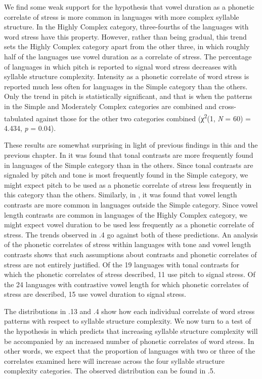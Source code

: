   We find some weak support for the hypothesis that vowel duration as a phonetic correlate of stress is more common in languages with more complex syllable structure. In the Highly Complex category, three-fourths of the languages with word stress have this property. However, rather than being gradual, this trend sets the Highly Complex category apart from the other three, in which roughly half of the languages use vowel duration as a correlate of stress. The percentage of languages in which pitch is reported to signal word stress decreases with syllable structure complexity. Intensity as a phonetic correlate of word stress is reported much less often for languages in the Simple category than the others. Only the trend in pitch is statistically significant, and that is when the patterns in the Simple and Moderately Complex categories are combined and cross-tabulated against those for the other two categories combined (χ\textsuperscript{2}(1, \textit{N} = 60) = 4.434, \textit{p} = 0.04).

  These results are somewhat surprising in light of previous findings in this and the previous chapter. In  it was found that tonal contrasts are more frequently found in languages of the Simple category than in the others. Since tonal contrasts are signaled by pitch and tone is most frequently found in the Simple category, we might expect pitch to be used as a phonetic correlate of stress less frequently in this category than the others. Similarly, in , it was found that vowel length contrasts are more common in languages outside the Simple category. Since vowel length contrasts are common in languages of the Highly Complex category, we might expect vowel duration to be used less frequently as a phonetic correlate of stress. The trends observed in .4 go against both of these predictions. An analysis of the phonetic correlates of stress within languages with tone and vowel length contrasts shows that such assumptions about contrasts and phonetic correlates of stress are not entirely justified. Of the 19 languages with tonal contrasts for which the phonetic correlates of stress described, 11 use pitch to signal stress. Of the 24 languages with contrastive vowel length for which phonetic correlates of stress are described, 15 use vowel duration to signal stress. 

  The distributions in .13 and .4 show how each individual correlate of word stress patterns with respect to syllable structure complexity. We now turn to a test of the hypothesis in  which predicts that increasing syllable structure complexity will be accompanied by an increased number of phonetic correlates of word stress. In other words, we expect that the proportion of languages with two or three of the correlates examined here will increase across the four syllable structure complexity categories. The observed distribution can be found in .5.

